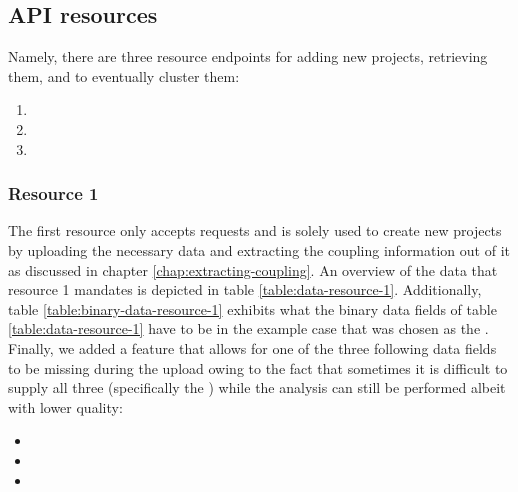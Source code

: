 \documentclass[12pt,a4paper]{report}
\begin{document}
\subsection{API resources} \label{subsect:api-resources}

Namely, there are three resource endpoints for adding new projects, retrieving them,
and to eventually cluster them:
\begin{enumerate}[noitemsep]
    \item {}
    \item {}
    \item {}
\end{enumerate}


\subsubsection{Resource 1}
The first resource only accepts  requests and is solely used to
create new projects by uploading the necessary data and extracting the
coupling information out of it as discussed in chapter \ref{chap:extracting-coupling}.
An overview of the data that resource 1 mandates is depicted in table
\ref{table:data-resource-1}.
Additionally, table \ref{table:binary-data-resource-1} exhibits what the
binary data fields of table \ref{table:data-resource-1} have to be in
the example case that  was chosen as the .
Finally, we added a feature that allows for one of the three following
data fields to be missing during the upload owing to the fact that sometimes
it is difficult to supply all three (specifically the )
while the analysis can still be performed albeit with lower quality:
\begin{itemize}[noitemsep]
    \item {}
    \item {}
    \item {}
\end{itemize}
\end{document}
